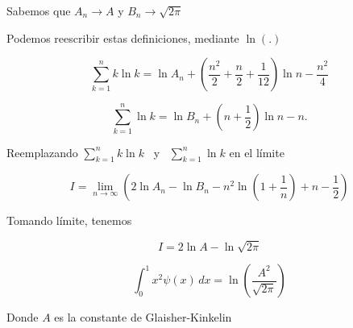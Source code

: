 {	Sabemos que $A_n \rightarrow A$ y $B_n\rightarrow \sqrt{2\pi}$

	Podemos reescribir estas definiciones, mediante $\ln (.)$

	$$
		\sum_{k=1}^{n} k \ln k
		= \ln A_n + \left( \frac{n^2}{2} + \frac{n}{2} + \frac{1}{12} \right) \ln n - \frac{n^2}{4}
	$$

	$$
		\sum_{k=1}^{n} \ln k
		= \ln B_n + \left(n + \frac{1}{2}\right) \ln n - n.
	$$






	Reemplazando  $ \displaystyle \sum_{k=1}^{n} k \ln k$  \, y \,  $\displaystyle\sum_{k=1}^{n} \ln k $ en el límite

	$$
		I= \lim_{n\to\infty} \left(2\ln A_n - \ln B_n - n^2 \ln\left(1+\frac{1}{n}\right) + n - \frac{1}{2} \right)
	$$

	Tomando límite, tenemos

	$$
		I= 2\ln A - \ln\sqrt{2\pi}
	$$



}
\begin{LnxRptaBox}
	$$
		\int_0^1 x^2 \psi(x) \, dx = \ln\left(\dfrac{A^2}{\sqrt{2\pi}} \right)
	$$
\end{LnxRptaBox}
Donde $A$  es la constante de Glaisher-Kinkelin \\
